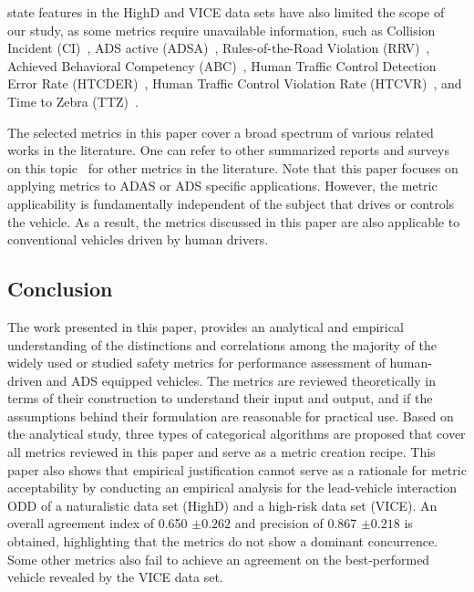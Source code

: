 \documentclass[journal]{IEEEtran}
\begin{document}
state features in the HighD and VICE data sets have also limited the scope of our study, as some metrics require unavailable information, such as Collision Incident (CI)~\cite{wishart2020driving}, ADS active (ADSA)~\cite{wishart2020driving}, Rules-of-the-Road Violation (RRV)~\cite{wishart2020driving}, Achieved Behavioral Competency (ABC)~\cite{wishart2020driving}, Human Traffic Control Detection Error Rate (HTCDER)~\cite{wishart2020driving}, Human Traffic Control Violation Rate (HTCVR)~\cite{wishart2020driving}, and Time to Zebra (TTZ)~\cite{varhelyi1998drivers}. 

The selected metrics in this paper cover a broad spectrum of various related works in the literature. One can refer to other summarized reports and surveys on this topic~\cite{griffor2019workshop,wishart2020driving,wang2021review,westhofen2022criticality,elli2021evaluation,jammula2022evaluation,ieee2022white,kidambi2022sensitivity, como2023evaluating} for other metrics in the literature. Note that this paper focuses on applying metrics to ADAS or ADS specific applications. However, the metric applicability is fundamentally independent of the subject that drives or controls the vehicle. As a result, the metrics discussed in this paper are also applicable to conventional vehicles driven by human drivers.


\subsection{Conclusion}
The work presented in this paper, provides an analytical and empirical understanding of the distinctions and correlations among the majority of the widely used or studied safety metrics for performance assessment of human-driven and ADS equipped vehicles. The metrics are reviewed theoretically in terms of their construction to understand their input and output, and if the assumptions behind their formulation are reasonable for practical use. Based on the analytical study, three types of categorical algorithms are proposed that cover all metrics reviewed in this paper and serve as a metric creation recipe. This paper also shows that empirical justification cannot serve as a rationale for metric acceptability by conducting an empirical analysis for the lead-vehicle interaction ODD of a naturalistic data set (HighD) and a high-risk data set (VICE). An overall agreement index of 0.650 $\pm 0.262$ and precision of 0.867 $\pm 0.218$ is obtained, highlighting that the metrics do not show a dominant concurrence. Some other metrics also fail to achieve an agreement on the best-performed vehicle revealed by the VICE data set.
\end{document}
